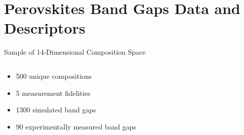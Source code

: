 \documentclass[10pt, aspectratio=169, presentation]{beamer}
\begin{document}
\section{Perovskites Band Gaps Data and Descriptors}
\label{sec:org8595ee1}
\begin{frame}[label={sec:orgbf08fa9}]{Sample of 14-Dimensional Composition Space}
\begin{columns}
\begin{column}{0.5\columnwidth}
\begin{itemize}
\item 500 unique compositions
\item 5 measurement fidelities
\item 1300 simulated band gaps
\item 90 experimentally measured band gaps
\end{itemize}

 
\begin{center}

\end{center}
\end{column}

\begin{column}{0.5\columnwidth}
 
\begin{center}

\end{center}
\end{column}
\end{columns}
\end{frame}
\end{document}
